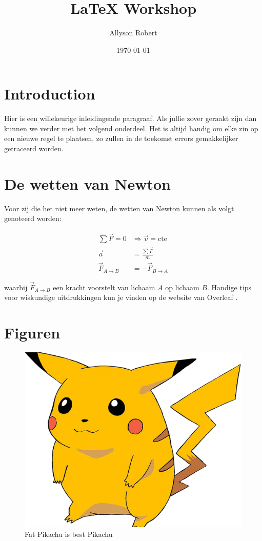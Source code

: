 \documentclass{article}
\title{LaTeX Workshop}
\author{Allyson Robert}
\date{\today}
\begin{document}
\maketitle
\tableofcontents

\section{Introduction}
\label{sec:intro}
Hier is een willekeurige inleidingende paragraaf. 
Als jullie zover geraakt zijn dan kunnen we verder met het volgend onderdeel.
Het is altijd handig om elke zin op een nieuwe regel te plaatsen, zo zullen in de toekomst errors gemakkelijker getraceerd worden.

\section{De wetten van Newton}
Voor zij die het niet meer weten, de wetten van Newton kunnen als volgt genoteerd worden:

\begin{align}
    \sum \vec{F} = 0 &\Rightarrow \vec{v} = \text{cte}\\
    \vec{a} &= \frac{\sum \vec{F}}{m} \\
    \vec{F}_{A\to B} &= -\vec{F}_{B \to A}
\end{align}

waarbij $\vec{F}_{A \to B}$ een kracht voorstelt van lichaam $A$ op lichaam $B$.
Handige tips voor wiskundige uitdrukkingen kun je vinden op de website van Overleaf \cite{OverleafMath}.

\section{Figuren}
\begin{figure}[H]
    \centering
    \includegraphics[width=\textwidth]{img/pikachu_transparent.png}
    \caption{Fat Pikachu is best Pikachu}
    \label{fig:pikachu}
\end{figure}
\end{document}

